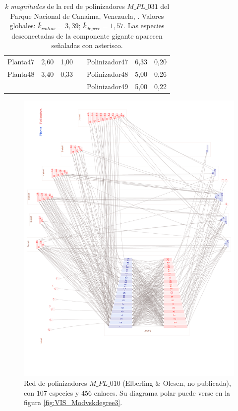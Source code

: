 \begin{table}[htbp]
\begin{tabular}{lrrrlrr}
    Planta47 & 2,60 & 1,00 &      & Polinizador47 & 6,33 & 0,20 \\
    Planta48 & 3,40 & 0,33 &      & Polinizador48 & 5,00 & 0,26 \\
         &      &      &      & Polinizador49 & 5,00 & 0,22 \\
    \bottomrule
    \end{tabular}%
    \caption{\label{table:kmag_pl_031} \textit{k magnitudes} de la red  de polinizadores $M\_PL\_031$ del Parque Nacional de Canaima, Venezuela, \cite{ramirez1989biologia}. Valores globales: $\overline k_{radius} = 3,39$; $\overline k_{degree} = 1,57$. Las especies desconectadas de la componente gigante aparecen señaladas con asterisco.}
\end{table}%

\clearpage
\begin{figure}[ht!]
\centering
\includegraphics[scale=0.6]{Figures/VIS_M_PL_010_ziggurat.png}
\caption {Red de polinizadores $M\_PL\_010$ (Elberling \& Olesen, no publicada), con $107$ especies y $456$ enlaces. Su diagrama polar puede verse en la figura \ref{fig:VIS_Modvskdegree3}.}
\label{fig:VIS_M_PL_010_ziggurat}
\end{figure}

